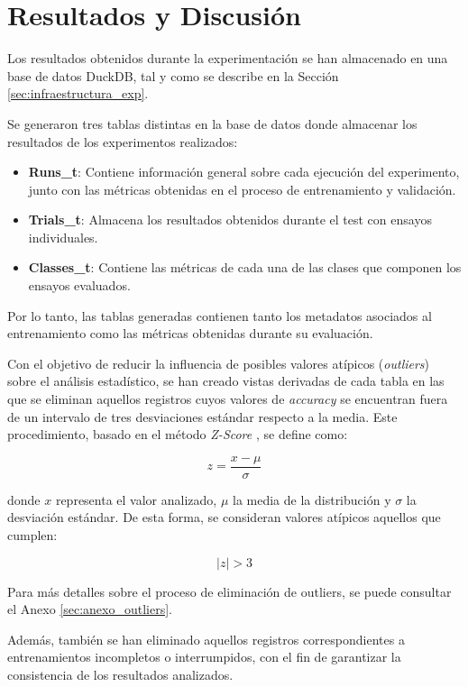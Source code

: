 \section{Resultados y Discusión} \label{sec:resultados}

Los resultados obtenidos durante la experimentación se han almacenado en una base de datos DuckDB, tal y como se describe en la Sección \ref{sec:infraestructura_exp}.

Se generaron tres tablas distintas en la base de datos donde almacenar los resultados de los experimentos realizados:
\begin{itemize}
    \item \textbf{Runs\_t}: Contiene información general sobre cada ejecución del experimento, junto con las métricas obtenidas en el proceso de entrenamiento y validación.
    \item \textbf{Trials\_t}: Almacena los resultados obtenidos durante el test con ensayos individuales.
    \item \textbf{Classes\_t}: Contiene las métricas de cada una de las clases que componen los ensayos evaluados.
\end{itemize}

Por lo tanto, las tablas generadas contienen tanto los metadatos asociados al entrenamiento como las métricas obtenidas durante su evaluación.

Con el objetivo de reducir la influencia de posibles valores atípicos (\textit{outliers}) sobre el análisis estadístico, se han creado vistas derivadas de cada tabla en las que se eliminan aquellos registros cuyos valores de \textit{accuracy} se encuentran fuera de un intervalo de tres desviaciones estándar respecto a la media. Este procedimiento, basado en el método \textit{Z-Score} \cite{venkataanusha_DetectingOutliers2019}, se define como:

\[
    z = \frac{x - \mu}{\sigma}
\]

donde \(x\) representa el valor analizado, \(\mu\) la media de la distribución y \(\sigma\) la desviación estándar. De esta forma, se consideran valores atípicos aquellos que cumplen:

\[
    |z| > 3
\]

Para más detalles sobre el proceso de eliminación de outliers, se puede consultar el Anexo \ref{sec:anexo_outliers}.

Además, también se han eliminado aquellos registros correspondientes a entrenamientos incompletos o interrumpidos, con el fin de garantizar la consistencia de los resultados analizados.

